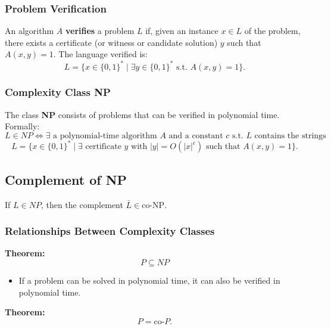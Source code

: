\subsubsection{Problem Verification}
\begin{definition}
    An algorithm $A$ \textbf{verifies} a problem $L$ if, given an instance $x \in L$ of the problem, there exists a certificate (or witness or candidate solution) $y$ such that $A(x, y) = 1$. The language verified is:
    \[
    L = \{ x \in \{0, 1\}^* \mid \exists y \in \{0, 1\}^* \text{ s.t. } A(x, y) = 1 \}.
    \]
\end{definition}

\subsubsection{Complexity Class NP}
\begin{definition}
    The class \textbf{NP} consists of problems that can be verified in polynomial time. Formally:
    \[
    L \in NP \iff \exists \text{ a polynomial-time algorithm } A \text{ and a constant } c \text{ s.t. } L \text{ contains the strings}
    \]
    \[
    L = \{ x \in \{0,1\}^* \mid \exists \text{ certificate } y \text{ with } |y| = O(|x|^c) \text{ such that } A(x, y) = 1 \}.
    \]
\end{definition}

\subsection{Complement of NP}
\begin{definition}
    If $L \in NP$, then the complement $\bar{L} \in \text{co-NP}$.
\end{definition}

\subsubsection{Relationships Between Complexity Classes}
\begin{theorem}
    \textbf{Theorem:}
\[
P \subseteq NP
\]
\begin{itemize}
    \item If a problem can be solved in polynomial time, it can also be verified in polynomial time.
\end{itemize}

\textbf{Theorem:}
\[
P = \text{co-}P.
\]

\end{theorem}


